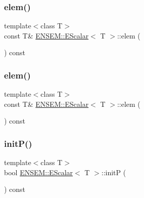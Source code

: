 \mbox{\label{classENSEM_1_1EScalar_ab3fb9173e700cc3e0bf94ffcb9d04c29}} 
\subsubsection{\texorpdfstring{elem()}{elem()}\hspace{0.1cm}{\footnotesize\ttfamily [3/4]}}
{\footnotesize\ttfamily template$<$class T$>$ \\
const T\& \mbox{\hyperlink{classENSEM_1_1EScalar}{E\+N\+S\+E\+M\+::\+E\+Scalar}}$<$ T $>$\+::elem (\begin{DoxyParamCaption}{ }\end{DoxyParamCaption}) const\hspace{0.3cm}{\ttfamily [inline]}}

\mbox{\label{classENSEM_1_1EScalar_ab3fb9173e700cc3e0bf94ffcb9d04c29}} 
\subsubsection{\texorpdfstring{elem()}{elem()}\hspace{0.1cm}{\footnotesize\ttfamily [4/4]}}
{\footnotesize\ttfamily template$<$class T$>$ \\
const T\& \mbox{\hyperlink{classENSEM_1_1EScalar}{E\+N\+S\+E\+M\+::\+E\+Scalar}}$<$ T $>$\+::elem (\begin{DoxyParamCaption}{ }\end{DoxyParamCaption}) const\hspace{0.3cm}{\ttfamily [inline]}}

\mbox{\label{classENSEM_1_1EScalar_ac5b2f0fbee6aa61f80bcd2d0b4d5188c}} 
\subsubsection{\texorpdfstring{initP()}{initP()}\hspace{0.1cm}{\footnotesize\ttfamily [1/2]}}
{\footnotesize\ttfamily template$<$class T$>$ \\
bool \mbox{\hyperlink{classENSEM_1_1EScalar}{E\+N\+S\+E\+M\+::\+E\+Scalar}}$<$ T $>$\+::initP (\begin{DoxyParamCaption}{ }\end{DoxyParamCaption}) const\hspace{0.3cm}{\ttfamily [inline]}}



